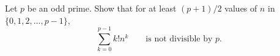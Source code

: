 Let $p$ be an odd prime. Show that for at least $(p+1)/2$ values of $n$ in $\{0,1,2,\ldots,p-1\}$,
\[
	\sum_{k=0}^{p-1}k!n^k \qquad \text{is not divisible by } p.
\]
